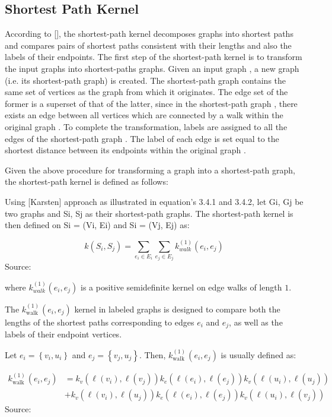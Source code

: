 \subsection{Shortest Path Kernel}

According to [\cite{Karsten:2005}], the shortest-path kernel decomposes graphs into shortest paths and compares pairs of shortest paths consistent with their lengths and also the labels of their endpoints. The first step of the shortest-path kernel is to transform the input graphs into shortest-paths graphs. Given an input graph , a new graph  (i.e. its shortest-path graph) is created. The shortest-path graph  contains the same set of vertices as the graph from which it originates. The edge set of the former is a superset of that of the latter, since in the shortest-path graph , there exists an edge between all vertices which are connected by a walk within the original graph . To complete the transformation, labels are assigned to all the edges of the shortest-path graph . The label of each edge is set equal to the shortest distance between its endpoints within the original graph .

Given the above procedure for transforming a graph into a shortest-path graph, the shortest-path kernel is defined as follows:

Using [Karsten] approach as illustrated in equation's 3.4.1 and 3.4.2, let Gi, Gj be two graphs and Si, Sj as their shortest-path graphs. The shortest-path kernel is then defined on Si  = (Vi, Ei) and Si = (Vj, Ej) as:

\begin{equation}
k\left(S_{i}, S_{j}\right)=\sum_{e_{i} \in E_{i}} \sum_{e_{j} \in E_{j}} k_{w a l k}^{(1)}\left(e_{i}, e_{j}\right)
\end{equation}
Source: \cite{Siglidis:2018}

where $k_{w a l k}^{(1)}\left(e_{i}, e_{j}\right)$ is a positive semidefinite kernel on edge walks of length $1 .$

The $k_{\text {walk }}^{(1)}\left(e_{i}, e_{j}\right)$ kernel in labeled graphs is designed to compare both the lengths of the shortest paths corresponding to edges $e_{i}$ and $e_{j}$, as well as the labels of their endpoint vertices.

Let $e_{i}=\left\{v_{i}, u_{i}\right\}$ and $e_{j}=\left\{v_{j}, u_{j}\right\}$. Then, $k_{\text {walk }}^{(1)}\left(e_{i}, e_{j}\right)$ is usually defined as:

\begin{equation}
\begin{aligned}
k_{\text {walk }}^{(1)}\left(e_{i}, e_{j}\right) &=k_{v}\left(\ell\left(v_{i}\right), \ell\left(v_{j}\right)\right) k_{e}\left(\ell\left(e_{i}\right), \ell\left(e_{j}\right)\right) k_{v}\left(\ell\left(u_{i}\right), \ell\left(u_{j}\right)\right) \\
&+k_{v}\left(\ell\left(v_{i}\right), \ell\left(u_{j}\right)\right) k_{e}\left(\ell\left(e_{i}\right), \ell\left(e_{j}\right)\right) k_{v}\left(\ell\left(u_{i}\right), \ell\left(v_{j}\right)\right)
\end{aligned}
\end{equation}
Source: \cite{Siglidis:2018}

